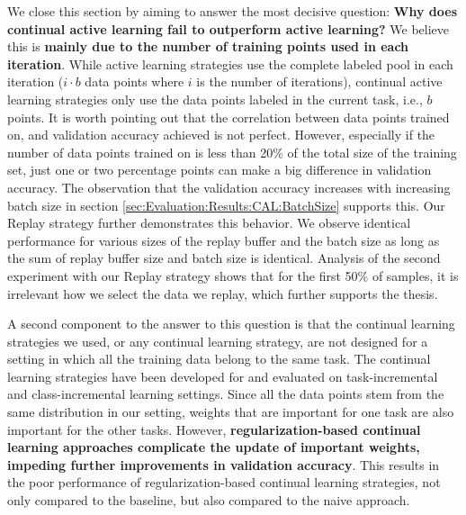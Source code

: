We close this section by aiming to answer the most decisive question: \textbf{Why does continual active learning fail to outperform active learning?} We believe this is \textbf{mainly
due to the number of training points used in each iteration}. While active learning strategies use the complete labeled pool in each iteration ($i \cdot b$ data
points where $i$ is the number of iterations), continual active learning strategies only use the data points labeled in the current task, i.e., $b$ points.
It is worth pointing out that the correlation between data points trained on, and validation accuracy achieved is not perfect. However, especially if the
number of data points trained on is less than 20\% of the total size of the training set, just one or two percentage points can make a big difference in validation
accuracy. The observation that the validation accuracy increases with increasing batch size in section \ref{sec:Evaluation:Results:CAL:BatchSize} supports this.
Our Replay strategy further demonstrates this behavior. We observe identical performance for various sizes of the replay buffer and the batch size as long as the sum
of replay buffer size and batch size is identical. Analysis of the second experiment with our Replay strategy shows that for the first 50\% of samples, it is irrelevant
how we select the data we replay, which further supports the thesis. \par
A second component to the answer to this question is that the continual learning strategies we used, or any continual learning strategy, are not
designed for a setting in which all the training data belong to the same task. The continual learning strategies have been developed for and evaluated on task-incremental
and class-incremental learning settings. Since all the data points stem from the same distribution in our setting, weights that are important for one task are also
important for the other tasks. However,  \textbf{regularization-based continual learning approaches complicate the update of important weights, impeding further improvements
in validation accuracy}. This results in the poor performance of regularization-based continual learning strategies, not only compared to the baseline, but also compared
to the naive approach.


